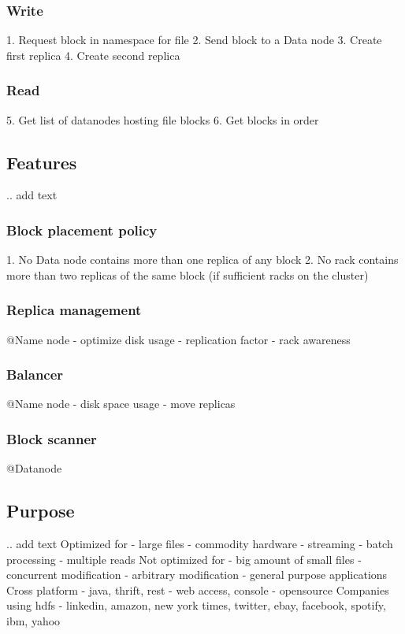 \documentclass{sig-alternate}
\begin{document}
\subsubsection{Write}
1. Request block in namespace for file
2. Send block to a Data node
3. Create first replica
4. Create second replica

\subsubsection{Read}
5. Get list of datanodes hosting file blocks
6. Get blocks in order

\subsection{Features}
.. add text


\subsubsection{Block placement policy}
1. No Data node contains more than one replica of any block
2. No rack contains more than two replicas of the same block (if sufficient racks on the cluster)

\subsubsection{Replica management}
@Name node
- optimize disk usage
- replication factor
- rack awareness

\subsubsection{Balancer}
@Name node
- disk space usage
- move replicas

\subsubsection{Block scanner}
@Datanode

\subsection{Purpose}
.. add text
Optimized for
- large files
- commodity hardware
- streaming
- batch processing
- multiple reads
Not optimized for
- big amount of small files
- concurrent modification
- arbitrary modification
- general purpose applications
Cross platform
- java, thrift, rest
- web access, console
- opensource
Companies using hdfs
- linkedin, amazon, new york times, twitter, ebay, facebook, spotify, ibm, yahoo
\end{document}
